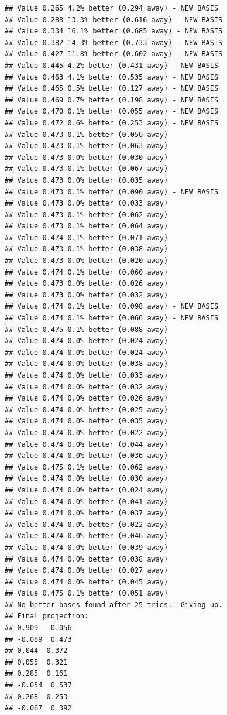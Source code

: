 \documentclass{monashthesis}
\begin{document}
\begin{verbatim}
## Value 0.265 4.2% better (0.294 away) - NEW BASIS
## Value 0.288 13.3% better (0.616 away) - NEW BASIS
## Value 0.334 16.1% better (0.685 away) - NEW BASIS
## Value 0.382 14.3% better (0.733 away) - NEW BASIS
## Value 0.427 11.8% better (0.602 away) - NEW BASIS
## Value 0.445 4.2% better (0.431 away) - NEW BASIS
## Value 0.463 4.1% better (0.535 away) - NEW BASIS
## Value 0.465 0.5% better (0.127 away) - NEW BASIS
## Value 0.469 0.7% better (0.198 away) - NEW BASIS
## Value 0.470 0.1% better (0.055 away) - NEW BASIS
## Value 0.472 0.6% better (0.253 away) - NEW BASIS
## Value 0.473 0.1% better (0.056 away)
## Value 0.473 0.1% better (0.063 away)
## Value 0.473 0.0% better (0.030 away)
## Value 0.473 0.1% better (0.067 away)
## Value 0.473 0.0% better (0.035 away)
## Value 0.473 0.1% better (0.090 away) - NEW BASIS
## Value 0.473 0.0% better (0.033 away)
## Value 0.473 0.1% better (0.062 away)
## Value 0.473 0.1% better (0.064 away)
## Value 0.474 0.1% better (0.071 away)
## Value 0.473 0.1% better (0.038 away)
## Value 0.473 0.0% better (0.020 away)
## Value 0.474 0.1% better (0.060 away)
## Value 0.473 0.0% better (0.026 away)
## Value 0.473 0.0% better (0.032 away)
## Value 0.474 0.1% better (0.098 away) - NEW BASIS
## Value 0.474 0.1% better (0.066 away) - NEW BASIS
## Value 0.475 0.1% better (0.088 away)
## Value 0.474 0.0% better (0.024 away)
## Value 0.474 0.0% better (0.024 away)
## Value 0.474 0.0% better (0.038 away)
## Value 0.474 0.0% better (0.033 away)
## Value 0.474 0.0% better (0.032 away)
## Value 0.474 0.0% better (0.026 away)
## Value 0.474 0.0% better (0.025 away)
## Value 0.474 0.0% better (0.035 away)
## Value 0.474 0.0% better (0.022 away)
## Value 0.474 0.0% better (0.044 away)
## Value 0.474 0.0% better (0.036 away)
## Value 0.475 0.1% better (0.062 away)
## Value 0.474 0.0% better (0.030 away)
## Value 0.474 0.0% better (0.024 away)
## Value 0.474 0.0% better (0.041 away)
## Value 0.474 0.0% better (0.037 away)
## Value 0.474 0.0% better (0.022 away)
## Value 0.474 0.0% better (0.046 away)
## Value 0.474 0.0% better (0.039 away)
## Value 0.474 0.0% better (0.038 away)
## Value 0.474 0.0% better (0.027 away)
## Value 0.474 0.0% better (0.045 away)
## Value 0.475 0.1% better (0.051 away)
## No better bases found after 25 tries.  Giving up.
## Final projection: 
## 0.909  -0.056  
## -0.089  0.473  
## 0.044  0.372  
## 0.055  0.321  
## 0.285  0.161  
## -0.054  0.537  
## 0.268  0.253  
## -0.067  0.392
\end{verbatim}
\end{document}
